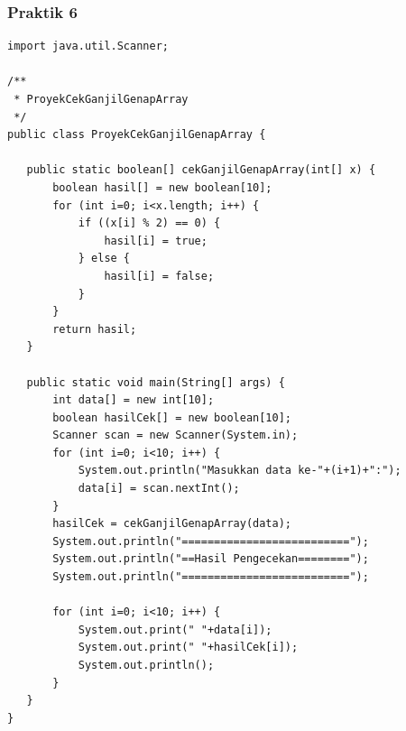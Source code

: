\documentclass[a4paper,12pt]{article}
\begin{document}
\subsubsection{Praktik 6}
\begin{lstlisting}
import java.util.Scanner;

/**
 * ProyekCekGanjilGenapArray
 */
public class ProyekCekGanjilGenapArray {

   public static boolean[] cekGanjilGenapArray(int[] x) {
       boolean hasil[] = new boolean[10];
       for (int i=0; i<x.length; i++) {
           if ((x[i] % 2) == 0) {
               hasil[i] = true;
           } else {
               hasil[i] = false;
           }
       }
       return hasil;
   }

   public static void main(String[] args) {
       int data[] = new int[10];
       boolean hasilCek[] = new boolean[10];
       Scanner scan = new Scanner(System.in);
       for (int i=0; i<10; i++) {
           System.out.println("Masukkan data ke-"+(i+1)+":");
           data[i] = scan.nextInt();
       }
       hasilCek = cekGanjilGenapArray(data);
       System.out.println("==========================");
       System.out.println("==Hasil Pengecekan========");
       System.out.println("==========================");

       for (int i=0; i<10; i++) {
           System.out.print(" "+data[i]);
           System.out.print(" "+hasilCek[i]);
           System.out.println();
       }
   }
}
\end{lstlisting}
\end{document}

